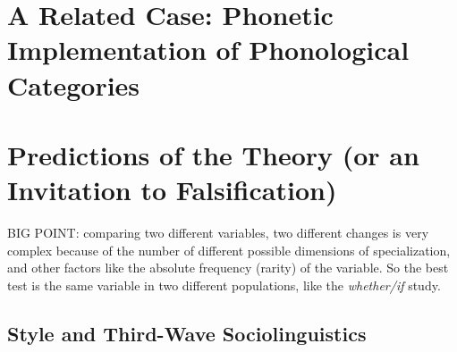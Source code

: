 %
%
%
%
%
%
%

\section{A Related Case: Phonetic Implementation of Phonological Categories}


\section{Predictions of the Theory (or an Invitation to Falsification)}
BIG POINT: comparing two different variables, two different changes is very complex because of the number of different possible dimensions of specialization, and other factors like the absolute frequency (rarity) of the variable.
So the best test is the same variable in two different populations, like the \textsl{whether/if} study.

\subsection{Style and Third-Wave Sociolinguistics}





